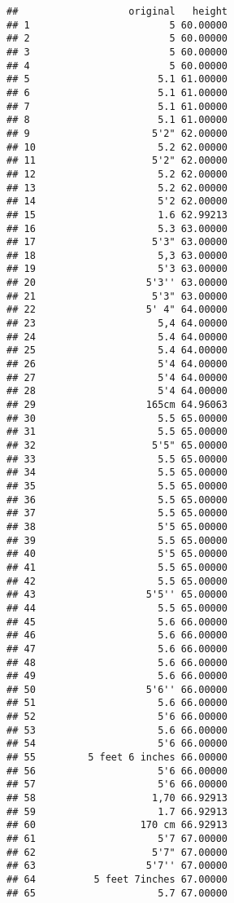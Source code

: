 \documentclass[
]{article}
\begin{document}
\begin{verbatim}
##                   original   height
## 1                        5 60.00000
## 2                        5 60.00000
## 3                        5 60.00000
## 4                        5 60.00000
## 5                      5.1 61.00000
## 6                      5.1 61.00000
## 7                      5.1 61.00000
## 8                      5.1 61.00000
## 9                     5'2" 62.00000
## 10                     5.2 62.00000
## 11                    5'2" 62.00000
## 12                     5.2 62.00000
## 13                     5.2 62.00000
## 14                     5'2 62.00000
## 15                     1.6 62.99213
## 16                     5.3 63.00000
## 17                    5'3" 63.00000
## 18                     5,3 63.00000
## 19                     5'3 63.00000
## 20                   5'3'' 63.00000
## 21                    5'3" 63.00000
## 22                   5' 4" 64.00000
## 23                     5,4 64.00000
## 24                     5.4 64.00000
## 25                     5.4 64.00000
## 26                     5'4 64.00000
## 27                     5'4 64.00000
## 28                     5'4 64.00000
## 29                   165cm 64.96063
## 30                     5.5 65.00000
## 31                     5.5 65.00000
## 32                    5'5" 65.00000
## 33                     5.5 65.00000
## 34                     5.5 65.00000
## 35                     5.5 65.00000
## 36                     5.5 65.00000
## 37                     5.5 65.00000
## 38                     5'5 65.00000
## 39                     5.5 65.00000
## 40                     5'5 65.00000
## 41                     5.5 65.00000
## 42                     5.5 65.00000
## 43                   5'5'' 65.00000
## 44                     5.5 65.00000
## 45                     5.6 66.00000
## 46                     5.6 66.00000
## 47                     5.6 66.00000
## 48                     5.6 66.00000
## 49                     5.6 66.00000
## 50                   5'6'' 66.00000
## 51                     5.6 66.00000
## 52                     5'6 66.00000
## 53                     5.6 66.00000
## 54                     5'6 66.00000
## 55         5 feet 6 inches 66.00000
## 56                     5'6 66.00000
## 57                     5'6 66.00000
## 58                    1,70 66.92913
## 59                     1.7 66.92913
## 60                  170 cm 66.92913
## 61                     5'7 67.00000
## 62                    5'7" 67.00000
## 63                   5'7'' 67.00000
## 64          5 feet 7inches 67.00000
## 65                     5.7 67.00000

\end{verbatim}
\end{document}
